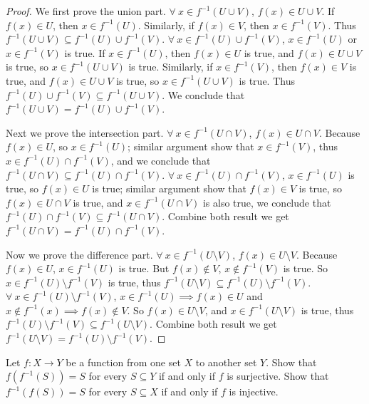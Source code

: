 \begin{proof}
We first prove the union part.
\(\forall\ x \in f^{-1}(U \cup V)\), \(f(x) \in U \cup V\).
If \(f(x) \in U\), then \(x \in f^{-1}(U)\).
Similarly, if \(f(x) \in V\), then \(x \in f^{-1}(V)\).
Thus \(f^{-1}(U \cup V) \subseteq f^{-1}(U) \cup f^{-1}(V)\).
\(\forall\ x \in f^{-1}(U) \cup f^{-1}(V)\), \(x \in f^{-1}(U)\) or \(x \in f^{-1}(V)\) is true.
If \(x \in f^{-1}(U)\), then \(f(x) \in U\) is true, and \(f(x) \in U \cup V\) is true, so \(x \in f^{-1}(U \cup V)\) is true.
Similarly, if \(x \in f^{-1}(V)\), then \(f(x) \in V\) is true, and \(f(x) \in U \cup V\) is true, so \(x \in f^{-1}(U \cup V)\) is true.
Thus \(f^{-1}(U) \cup f^{-1}(V) \subseteq f^{-1}(U \cup V)\).
We conclude that \(f^{-1}(U \cup V) = f^{-1}(U) \cup f^{-1}(V)\).

Next we prove the intersection part.
\(\forall\ x \in f^{-1}(U \cap V)\), \(f(x) \in U \cap V\).
Because \(f(x) \in U\), so \(x \in f^{-1}(U)\);
similar argument show that \(x \in f^{-1}(V)\), thus \(x \in f^{-1}(U) \cap f^{-1}(V)\), and we conclude that \(f^{-1}(U \cap V) \subseteq f^{-1}(U) \cap f^{-1}(V)\).
\(\forall\ x \in f^{-1}(U) \cap f^{-1}(V)\), \(x \in f^{-1}(U)\) is true, so \(f(x) \in U\) is true;
similar argument show that \(f(x) \in V\) is true, so \(f(x) \in U \cap V\) is true, and \(x \in f^{-1}(U \cap V)\) is also true, we conclude that \(f^{-1}(U) \cap f^{-1}(V) \subseteq f^{-1}(U \cap V)\).
Combine both result we get \(f^{-1}(U \cap V) = f^{-1}(U) \cap f^{-1}(V)\).

Now we prove the difference part.
\(\forall\ x \in f^{-1}(U \setminus V)\), \(f(x) \in U \setminus V\).
Because \(f(x) \in U\), \(x \in f^{-1}(U)\) is true.
But \(f(x) \notin V\), \(x \notin f^{-1}(V)\) is true.
So \(x \in f^{-1}(U) \setminus f^{-1}(V)\) is true, thus \(f^{-1}(U \setminus V) \subseteq f^{-1}(U) \setminus f^{-1}(V)\).
\(\forall\ x \in f^{-1}(U) \setminus f^{-1}(V)\), \(x \in f^{-1}(U) \implies f(x) \in U\) and \(x \notin f^{-1}(x) \implies f(x) \notin V\).
So \(f(x) \in U \setminus V\), and \(x \in f^{-1}(U \setminus V)\) is true, thus \( f^{-1}(U) \setminus f^{-1}(V) \subseteq f^{-1}(U \setminus V)\).
Combine both result we get \(f^{-1}(U \setminus V) = f^{-1}(U) \setminus f^{-1}(V)\).
\end{proof}

\begin{exercise}\label{exercise 3.4.5}
Let \(f : X \to Y\) be a function from one set \(X\) to another set \(Y\).
Show that \(f(f^{-1}(S)) = S\) for every \(S \subseteq Y\) if and only if \(f\) is surjective.
Show that \(f^{-1}(f(S)) = S\) for every \(S \subseteq X\) if and only if \(f\) is injective.
\end{exercise}

